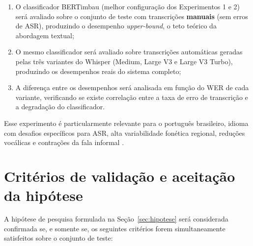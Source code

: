 \documentclass[
    12pt,                %
    openright,           %
    oneside,             %
    a4paper,             %
    english,             %
    brazil               %
]{abntex2}
\begin{document}
\begin{enumerate}
    \item O classificador BERTimbau (melhor configuração dos Experimentos 1 e 2) será avaliado sobre o conjunto de teste com transcrições \textbf{manuais} (sem erros de ASR), produzindo o desempenho \textit{upper-bound}, o teto teórico da abordagem textual;

    \item O mesmo classificador será avaliado sobre transcrições automáticas geradas pelas três variantes do Whisper (Medium, Large V3 e Large V3 Turbo), produzindo os desempenhos reais do sistema completo;

    \item A diferença entre os desempenhos será analisada em função do WER de cada variante, verificando se existe correlação entre a taxa de erro de transcrição e a degradação do classificador.
\end{enumerate}

Esse experimento é particularmente relevante para o português brasileiro, idioma com desafios específicos para ASR, alta variabilidade fonética regional, reduções vocálicas e contrações da fala informal \cite{CORAA2023, Bevilacqua2024}.

\section{Critérios de validação e aceitação da hipótese}
\label{sec:criterios_validacao}

A hipótese de pesquisa formulada na Seção~\ref{sec:hipotese} será considerada confirmada se, e somente se, os seguintes critérios forem simultaneamente satisfeitos sobre o conjunto de teste:
\end{document}

